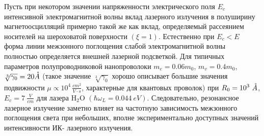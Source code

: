 Пусть при некотором значении напряженности электрического поля $E_c$ интенсивной электромагнитной волны вклад лазерного излучения в полуширину магнетоосцилляций примерно такой же как вклад, определяемый рассеянием носителей на шероховатой поверхности $\left(\xi =1\right)$. Естественно при $E_c<E$ форма линии межзонного поглощения слабой электромагнитной волны полностью определяется внешней лазерной подсветкой. Для типичных параметров полупроводниковой нанопроволоки $m_e=0.06m_0$, $m_v=0.4m_0$, $\sqrt[3]{{\gamma }_0}=20 \AA $ (такое значение $\sqrt[3]{{\gamma }_0}$ хорошо описывает большие значения подвижности $\mu \propto {10}^{4\ }\frac{cm^2}{V\cdot s}$, характерные для квантовых проволок) при $R_0={10}^3\ \AA $, $E_c=7\ \frac{V}{cm}$ для лазера H${}_{2}$O $\left(\hbar {\omega }_L=0.044\ eV\right)$. Следовательно, резонансное лазерное излучение заметно влияет на частотную зависимость межзонного поглощения света при небольших, вполне экспериментально доступных значений интенсивности ИК- лазерного излучения.
